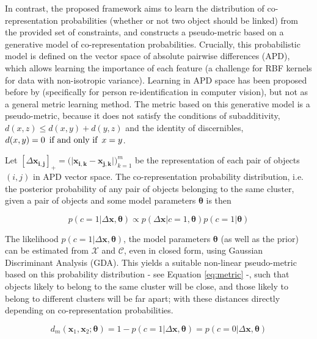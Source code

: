 In contrast, the proposed framework aims to learn the distribution of co-representation probabilities (whether or not two object should be linked) from the provided set of constraints, and constructs a pseudo-metric based on a generative model of co-representation probabilities. Crucially, this probabilistic model is defined on the vector space of absolute pairwise differences (APD), which allows learning the importance of each feature (a challenge for RBF kernels for data with non-isotropic variance). Learning in APD space has been proposed before by \cite{zheng2011person} (specifically for person re-identification in computer vision), but not as a general metric learning method. The metric based on this generative model is a pseudo-metric, because it does not satisfy the conditions of subadditivity, $d(x, z) \leq d(x, y)+d(y,z)$ and the identity of discernibles, $d(x, y) = 0 \enskip \text{if and only if} \enskip x = y$.

Let $[\Delta \boldsymbol{x_{i,j}}]_+ = \big( \lvert \boldsymbol{x_{i,k}} - \boldsymbol{x_{j,k}} \lvert \big)_{k=1}^m $ be the representation of each pair of objects $(i,j)$ in APD vector space. The co-representation probability distribution, i.e. the posterior probability of any pair of objects belonging to the same cluster, given a pair of objects and some model parameters $\boldsymbol{\theta}$ is then 

\begin{equation}
\label{eq:linkprob}
p(c=1|\Delta \boldsymbol{x}, \boldsymbol{\theta}) \propto p(\Delta \boldsymbol{x} | c=1, \boldsymbol{\theta}) p(c=1|\boldsymbol{\theta})
\end{equation}

The likelihood $ p(c=1|\Delta \boldsymbol{x}, \boldsymbol{\theta}) $, the model parameters $ \boldsymbol{\theta} $ (as well as the prior) can be estimated from $\mathcal{X}$ and $\mathcal{C}$, even in closed form, using Gaussian Discriminant Analysis (GDA). This yields a suitable non-linear pseudo-metric based on this probability distribution - see Equation \ref{eq:metric} -, such that objects likely to belong to the same cluster will be close, and those likely to belong to different clusters will be far apart; with these distances directly depending on co-representation probabilities. 

\begin{equation}
\label{eq:metric}
d_m(\boldsymbol x_1, \boldsymbol x_2; \boldsymbol{\theta}) = 1 - p(c=1|\Delta \boldsymbol x, \boldsymbol{\theta}) = p(c=0|\Delta \boldsymbol x, \boldsymbol{\theta})
\end{equation}

